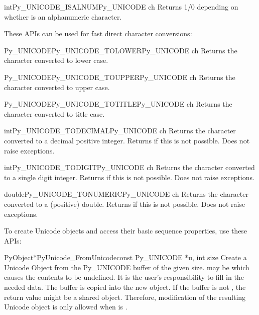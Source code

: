 \begin{cfuncdesc}{int}{Py_UNICODE_ISALNUM}{Py_UNICODE ch}
  Returns 1/0 depending on whether  is an alphanumeric
  character.
\end{cfuncdesc}

These APIs can be used for fast direct character conversions:

\begin{cfuncdesc}{Py_UNICODE}{Py_UNICODE_TOLOWER}{Py_UNICODE ch}
  Returns the character  converted to lower case.
\end{cfuncdesc}

\begin{cfuncdesc}{Py_UNICODE}{Py_UNICODE_TOUPPER}{Py_UNICODE ch}
  Returns the character  converted to upper case.
\end{cfuncdesc}

\begin{cfuncdesc}{Py_UNICODE}{Py_UNICODE_TOTITLE}{Py_UNICODE ch}
  Returns the character  converted to title case.
\end{cfuncdesc}

\begin{cfuncdesc}{int}{Py_UNICODE_TODECIMAL}{Py_UNICODE ch}
  Returns the character  converted to a decimal positive
  integer.  Returns  if this is not possible.  Does not raise
  exceptions.
\end{cfuncdesc}

\begin{cfuncdesc}{int}{Py_UNICODE_TODIGIT}{Py_UNICODE ch}
  Returns the character  converted to a single digit integer.
  Returns  if this is not possible.  Does not raise
  exceptions.
\end{cfuncdesc}

\begin{cfuncdesc}{double}{Py_UNICODE_TONUMERIC}{Py_UNICODE ch}
  Returns the character  converted to a (positive) double.
  Returns  if this is not possible.  Does not raise
  exceptions.
\end{cfuncdesc}


To create Unicode objects and access their basic sequence properties,
use these APIs:

\begin{cfuncdesc}{PyObject*}{PyUnicode_FromUnicode}{const Py_UNICODE *u,
                                                    int size}
  Create a Unicode Object from the Py_UNICODE buffer  of the
  given size.  may be \NULL{} which causes the contents to be
  undefined. It is the user's responsibility to fill in the needed
  data.  The buffer is copied into the new object. If the buffer is
  not \NULL, the return value might be a shared object. Therefore,
  modification of the resulting Unicode object is only allowed when
   is \NULL.
\end{cfuncdesc}

